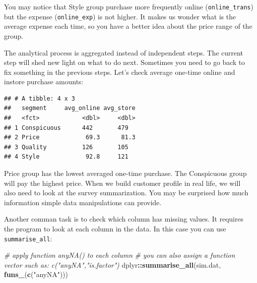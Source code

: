 \documentclass[12pt,]{krantz}
\newenvironment{Shaded}{\begin{snugshade}}{\end{snugshade}}
\newcommand{\KeywordTok}[1]{\textcolor[rgb]{0.13,0.29,0.53}{\textbf{#1}}}
\newcommand{\DataTypeTok}[1]{\textcolor[rgb]{0.13,0.29,0.53}{#1}}
\newcommand{\DecValTok}[1]{\textcolor[rgb]{0.00,0.00,0.81}{#1}}
\newcommand{\StringTok}[1]{\textcolor[rgb]{0.31,0.60,0.02}{#1}}
\newcommand{\CommentTok}[1]{\textcolor[rgb]{0.56,0.35,0.01}{\textit{#1}}}
\newcommand{\OperatorTok}[1]{\textcolor[rgb]{0.81,0.36,0.00}{\textbf{#1}}}
\newcommand{\NormalTok}[1]{#1}
\theoremstyle{definition}
\theoremstyle{definition}
\theoremstyle{definition}
\theoremstyle{remark}
\begin{document}
You may notice that Style group purchase more frequently online
(\texttt{online\_trans}) but the expense (\texttt{online\_exp}) is not
higher. It makes us wonder what is the average expense each time, so you
have a better idea about the price range of the group.

The analytical process is aggregated instead of independent steps. The
current step will shed new light on what to do next. Sometimes you need
to go back to fix something in the previous steps. Let's check average
one-time online and instore purchase amounts:

\begin{Shaded}
\end{Shaded}

\begin{verbatim}
## # A tibble: 4 x 3
##   segment     avg_online avg_store
##   <fct>            <dbl>     <dbl>
## 1 Conspicuous      442       479  
## 2 Price             69.3      81.3
## 3 Quality          126       105  
## 4 Style             92.8     121
\end{verbatim}

Price group has the lowest averaged one-time purchase. The Conspicuous
group will pay the highest price. When we build customer profile in real
life, we will also need to look at the survey summarization. You may be
surprised how much information simple data manipulations can provide.

Another comman task is to check which column has missing values. It
requires the program to look at each column in the data. In this case
you can use \texttt{summarise\_all}:

\begin{Shaded}
\begin{Highlighting}[]
\CommentTok{# apply function anyNA() to each column}
\CommentTok{# you can also assign a function vector such as: c("anyNA","is.factor")}
\NormalTok{dplyr}\OperatorTok{::}\KeywordTok{summarise_all}\NormalTok{(sim.dat, }\KeywordTok{funs_}\NormalTok{(}\KeywordTok{c}\NormalTok{(}\StringTok{"anyNA"}\NormalTok{)))}
\end{Highlighting}
\end{Shaded}
\end{document}
